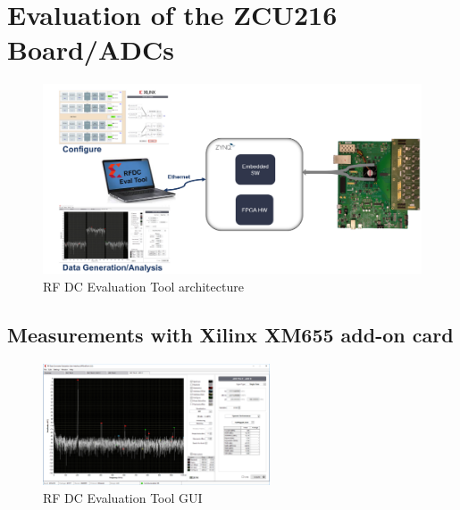 \section{Evaluation of the ZCU216 Board/ADCs}

\begin{figure}[H]
	\centering
	\includegraphics[width = \textwidth]{chap/04-characterization/img/zcu216evaltool.png}
	\caption{RF DC Evaluation Tool architecture \cite{zcu216evaltool}}
	\label{fig:evaltool}
\end{figure}


\subsection{Measurements with Xilinx XM655 add-on card}
\begin{figure}[H]
	\centering
	\includegraphics[width = 0.6\textwidth]{chap/04-characterization/img/evaltool.png}
	\caption{RF DC Evaluation Tool GUI \cite{zcu216evaltool}}
	\label{fig:evalgui}
\end{figure}


